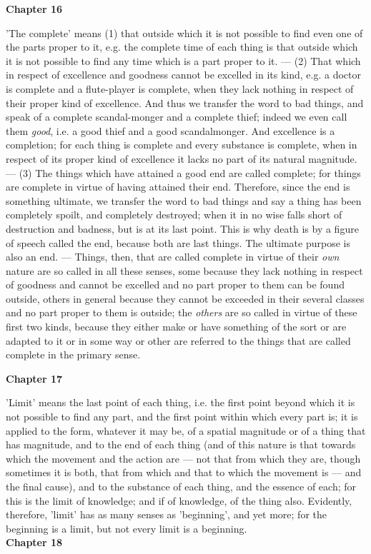 \textbf{Chapter 16}

'The complete' means (1) that outside which it is not possible to find even one of the parts proper to it, e.g. the complete time of each thing is that outside which it is not possible to find any time which is a part proper to it. — (2) That which in respect of excellence and goodness cannot be excelled in its kind, e.g. a doctor is complete and a flute-player is complete, when they lack nothing in respect of their proper kind of excellence. And thus we transfer the word to bad things, and speak of a complete scandal-monger and a complete thief; indeed we even call them \emph{good}, i.e. a good thief and a good scandalmonger. And excellence is a completion; for each thing is complete and every substance is complete, when in respect of its proper kind of excellence it lacks no part of its natural magnitude. — (3) The things which have attained a good end are called complete; for things are complete in virtue of having attained their end. Therefore, since the end is something ultimate, we transfer the word to bad things and say a thing has been completely spoilt, and completely destroyed; when it in no wise falls short of destruction and badness, but is at its last point. This is why death is by a figure of speech called the end, because both are last things. The ultimate purpose is also an end. — Things, then, that are called complete in virtue of their \emph{own} nature are so called in all these senses, some because they lack nothing in respect of goodness and cannot be excelled and no part proper to them can be found
outside, others in general because they cannot be exceeded in their several classes and no part proper to them is outside; the \emph{others} are so called in virtue of these first two kinds, because they either make or have something of the sort or are adapted to it or in some way or other are referred to the things that are called complete in the primary sense.

\textbf{Chapter 17}

'Limit' means the last point of each thing, i.e. the first point beyond which it is not possible to find any part, and the first point within which every part is; it is applied to the form, whatever it may be, of a spatial magnitude or of a thing that has magnitude, and to the end of each thing (and of this nature is that towards which the movement and the action are — not that from which they are, though sometimes it is both, that from which and that to which the movement is — and the final cause), and to the substance of each thing, and the essence of each; for this is the limit of knowledge; and if of knowledge, of the thing also. Evidently, therefore, 'limit' has as many senses as 'beginning', and yet more; for the beginning is a limit, but not every limit is a beginning.
\\
\textbf{Chapter 18}

